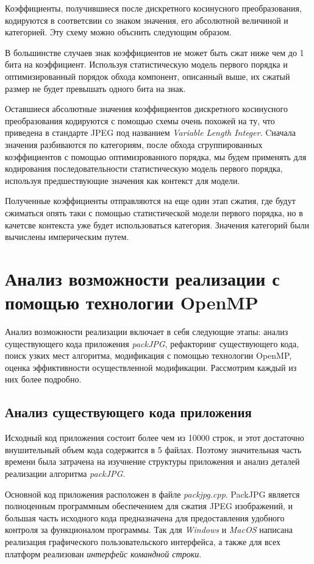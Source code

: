 \documentclass{matmex-diploma-custom}
\begin{document}
Коэффициенты, получившиеся после дискретного косинусного преобразования, кодируются в соответсвии со знаком значения, его абсолютной величиной и категорией. Эту схему можно объснить следующим образом.

В большинстве случаев знак коэффициентов не может быть сжат ниже чем до 1 бита на коэффициент. Используя статистическую модель первого порядка и оптимизированный порядок обхода компонент, описанный выше, их сжатый размер не будет превышать одного бита на знак.

Оставшиеся абсолютные значения коэффициентов дискретного косинусного преобразования кодируются с помощью схемы очень похожей на ту, что  приведена в стандарте JPEG под  названием \emph{Variable Length Integer}. Cначала значения разбиваются по категориям, после обхода сгруппированных коэффициентов с помощью оптимизрованного порядка, мы будем применять для кодирования последовательности статистическую модель первого порядка, используя предшествующие значения как контекст для модели.

Полученные коэффициенты отправляются на еще один этап сжатия, где будут сжиматься опять таки с помощью статистической модели первого порядка, но в качетсве контекста уже будет использоваться категория. Значения категорий были вычислены империческим путем.

\section{Анализ возможности реализации с помощью технологии OpenMP}
Анализ возможности  реализации включает в себя следующие этапы: анализ существующего кода приложения \emph{packJPG}, рефакторинг существующего кода, поиск узких мест алгоритма, модификация с помощью технологии OpenMP, оценка эффиктивности осуществленной модификации. Рассмотрим каждый из них более подробно.

\subsection{Анализ существующего кода приложения}
Исходный код приложения состоит более чем из 10000 строк, и этот достаточно внушительный объем кода содержится в 5 файлах. Поэтому значительная часть времени была затрачена на изучнение структуры приложения и анализ деталей реализации алгоритма \emph{packJPG}.

Основной код приложения расположен в файле \emph{packjpg.cpp}. PackJPG является полноценным программным обеспечением для сжатия JPEG изображений, и большая часть исходного кода предназначена для предоставления удобного контроля за функционалом программы. Так для \emph{Windows} и \emph{MacOS} написана реализация графического пользовательского интерфейса, а также для всех платформ реализован \emph{интерфейс командной строки}.
\end{document}

